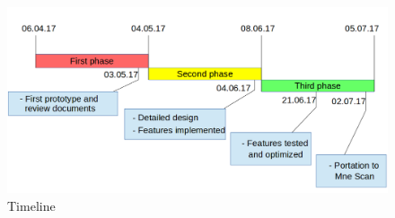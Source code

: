 ~\\

\begin{figure}[h]
	\begin{center}
		\includegraphics[width= 15cm]{figures/milestones_timeline.png}
		\caption{Timeline}
	\end{center}
\end{figure}

